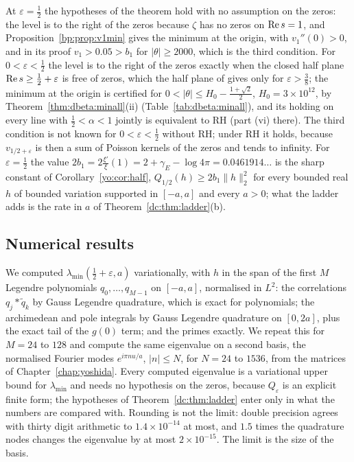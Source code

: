 At $\varepsilon=\frac12$ the hypotheses of the theorem hold with no assumption on the zeros: the level is to the right of the zeros because $\zeta$ has no zeros on $\operatorname{Re} s=1$, and Proposition~\ref{bp:prop:v1min} gives the minimum at the origin, with $v_1''(0)>0$, and in its proof $v_1>0.05>b_1$ for $|\theta|\ge2000$, which is the third condition. For $0<\varepsilon<\frac12$ the level is to the right of the zeros exactly when the closed half plane $\operatorname{Re} s\ge\frac12+\varepsilon$ is free of zeros, which the half plane of \cite{OAI26a} gives only for $\varepsilon>\frac38$; the minimum at the origin is certified for $0<|\theta|\le H_0-\frac{1+\sqrt2}2$, $H_0=3\times10^{12}$, by Theorem~\ref{thm:dbeta:minall}(ii) (Table~\ref{tab:dbeta:minall}), and its holding on every line with $\frac12<\alpha<1$ jointly is equivalent to RH (part (vi) there). The third condition is not known for $0<\varepsilon<\frac12$ without RH; under RH it holds, because $v_{1/2+\varepsilon}$ is then a sum of Poisson kernels of the zeros and tends to infinity. For $\varepsilon=\frac12$ the value $2b_1=2\frac{\xi'}{\xi}(1)=2+\gamma_E-\log4\pi=0.0461914\ldots$ is the sharp constant of Corollary~\ref{yo:cor:half}, $Q_{1/2}(h)\ge2b_1\|h\|_2^2$ for every bounded real $h$ of bounded variation supported in $[-a,a]$ and every $a>0$; what the ladder adds is the rate in $a$ of Theorem~\ref{dc:thm:ladder}(b).

\subsection{Numerical results}\label{dc:sec:numerics}

We computed $\lambda_{\min}(\frac12+\varepsilon,a)$ variationally, with $h$ in the span of the first $M$ Legendre polynomials $q_0,\dots,q_{M-1}$ on $[-a,a]$, normalised in $L^2$: the correlations $q_j*\tilde q_k$ by Gauss Legendre quadrature, which is exact for polynomials; the archimedean and pole integrals by Gauss Legendre quadrature on $[0,2a]$, plus the exact tail of the $g(0)$ term; and the primes exactly. We repeat this for $M=24$ to $128$ and compute the same eigenvalue on a second basis, the normalised Fourier modes $e^{i\pi nu/a}$, $|n|\le N$, for $N=24$ to $1536$, from the matrices of Chapter~\ref{chap:yoshida}. Every computed eigenvalue is a variational upper bound for $\lambda_{\min}$ and needs no hypothesis on the zeros, because $Q_\varepsilon$ is an explicit finite form; the hypotheses of Theorem~\ref{dc:thm:ladder} enter only in what the numbers are compared with. Rounding is not the limit: double precision agrees with thirty digit arithmetic to $1.4\times10^{-14}$ at most, and $1.5$ times the quadrature nodes changes the eigenvalue by at most $2\times10^{-15}$. The limit is the size of the basis.

